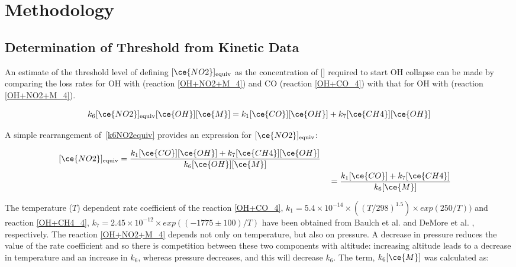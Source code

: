 \section{Methodology}

\subsection{Determination of Threshold \texorpdfstring{}{NOx} from Kinetic Data}
\label{4.2.1}
An estimate of the threshold level of  defining $[\ce{NO2}]_{\mathrm{equiv}}$ as the concentration of [] required to start OH collapse can be made by comparing the loss rates for OH with  (reaction \eqref{OH+NO2+M_4}) and CO (reaction \eqref{OH+CO_4}) with that for OH with  (reaction \eqref{OH+NO2+M_4}).

\begin{equation}
	 k_{6} [\ce{NO2}]_{\mathrm{equiv}} [\ce{OH}] [\ce{M}] = k_{1} [\ce{CO}] [\ce{OH}] + k_{7} [\ce{CH4}] [\ce{OH}]
\label{k6NO2equiv}
\end{equation}

A simple rearrangement of~\eqref{k6NO2equiv} provides an expression for $[\ce{NO2}]_{\mathrm{equiv}}$:

\begin{align}
\begin{split}
    [\ce{NO2}]_{\mathrm{equiv}} {}&= \frac{k_{1} [\ce{CO}] [\ce{OH}] + k_7 [\ce{CH4}] [\ce{OH}]}{k_6 [\ce{OH}] [\ce{M}]} \nonumber
\end{split} \\
    {}&= \frac{k_1 [\ce{CO}] + k_7 [\ce{CH4}]}{k_6 [\ce{M}]}
    \label{no2equiv}
\end{align}

The temperature ($T$) dependent rate coefficient of the reaction \eqref{OH+CO_4}, $k_1 = 5.4 \times 10^{-14} \times ((T/298)^{1.5}) \times exp (250/T))$ and reaction \eqref{OH+CH4_4}, $k_7 = 2.45 \times 10^{-12} \times exp \left (\left (-1775 \pm 100 \right )/ T \right )$ have been obtained from Baulch et al. \cite{Baulch1992} and DeMore et al. \cite{DeMore1997}, respectively. The reaction \eqref{OH+NO2+M_4} depends not only on temperature, but also on pressure. A decrease in pressure reduces the value of the rate coefficient and so there is competition between these two components with altitude: increasing altitude leads to a decrease in temperature and an increase in $k_6$, whereas pressure decreases, and this will decrease $k_6$. The term, $k_6 [\ce{M}]$ was calculated as:

